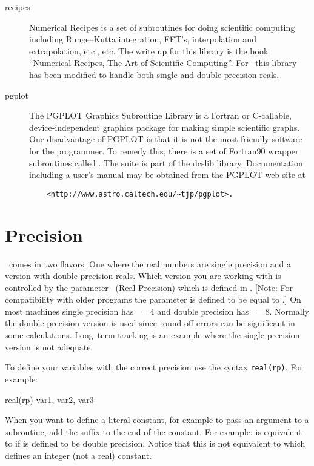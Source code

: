 \begin{description}
\item[recipes] Numerical Recipes is a set of subroutines for doing 
scientific computing including Runge--Kutta integration, FFT's,
interpolation and extrapolation, etc., etc. The write up for this
library is the book ``Numerical Recipes, The Art of Scientific
Computing''\cite{b:nr}. For \bmad\ this library has been modified to handle
both single and double precision reals.
\item[pgplot] The PGPLOT Graphics Subroutine Library is a Fortran or 
C-callable, device-independent graphics package for making simple
scientific graphs.  One disadvantage of PGPLOT is that it is not the
most friendly software for the programmer. To remedy this, there is a
set of Fortran90 wrapper subroutines called . The
 suite is part of the dcslib library. Documentation
including a user's manual
may be obtained from the PGPLOT web site at
\begin{verbatim}
    <http://www.astro.caltech.edu/~tjp/pgplot>.
\end{verbatim}

\end{description}

\section{Precision}

\bmad\ comes in two flavors: One where the real numbers are single
precision and a version with double precision reals. Which version you
are working with is controlled by the parameter \ (Real Precision)
which is defined in . [Note: For compatibility with older
programs the parameter  is defined to be equal to .]  On most
machines single precision has \ = 4 and double precision has \ =
8. Normally the double precision version is used since round-off
errors can be significant in some calculations. Long--term tracking is
an example where the single precision version is not adequate. 

To define your variables with the correct precision use the syntax
{\tt real(rp)}. For example:
\begin{example}
    real(rp) var1, var2, var3
\end{example}
When you want to define a literal constant, for example to pass an
argument to a subroutine, add the suffix  to the end of the
constant. For example:  is equivalent to  if
 is defined to be double precision. Notice that this is not
equivalent to  which defines an integer (not a real) constant.


